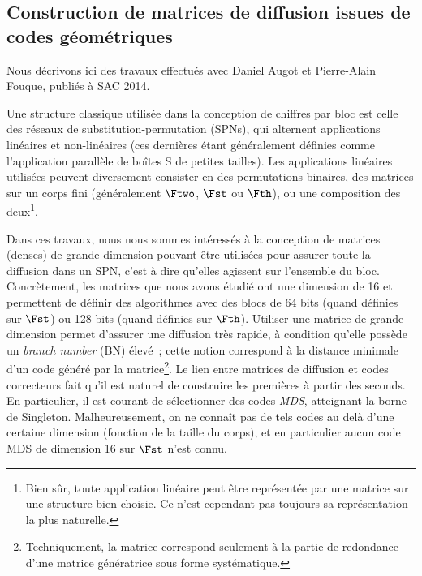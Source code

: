 \subsection[{Construction de matrices de diffusion issues de codes géométriques \cite{DBLP:conf/sacrypt/AugotFK14}}]{Construction de matrices de diffusion issues de codes géométriques~\cite{DBLP:conf/sacrypt/AugotFK14}}

Nous décrivons ici des travaux effectués avec Daniel Augot et Pierre-Alain Fouque, publiés à SAC 2014.

\medskip

Une structure classique utilisée dans la conception de chiffres par bloc est celle des réseaux de substitution-permutation (SPNs), qui alternent applications linéaires et non-linéaires (ces dernières étant
généralement définies comme l'application parallèle de boîtes S de petites tailles). Les applications linéaires utilisées peuvent diversement consister en des permutations binaires, des matrices sur
un corps fini (généralement $\Ftwo$, $\Fst$ ou $\Fth$), ou une composition des deux\footnote{Bien sûr, toute application linéaire peut être représentée par une matrice sur une structure bien choisie. Ce n'est
cependant pas toujours sa représentation la plus naturelle.}.

Dans ces travaux, nous nous sommes intéressés à la conception de matrices (denses)
de grande dimension pouvant être utilisées pour assurer toute la diffusion dans un SPN, c'est à dire qu'elles agissent sur l'ensemble du bloc. Concrètement, les matrices que nous
avons étudié ont une dimension de 16
et permettent de définir des algorithmes avec des blocs de 64 bits (quand définies sur $\Fst$) ou 128 bits (quand définies sur $\Fth$).
Utiliser une matrice de grande dimension permet d'assurer une diffusion très rapide, à condition qu'elle possède un \emph{branch number} (BN) élevé~; cette notion correspond à la
distance minimale d'un code généré par la matrice\footnote{Techniquement, la matrice correspond seulement à la partie de redondance d'une matrice génératrice sous forme systématique.}.
Le lien entre matrices de diffusion et codes correcteurs fait qu'il est naturel de construire les premières à partir des seconds. En particulier, il est courant de sélectionner
des codes \emph{MDS}, atteignant la borne de Singleton. Malheureusement, on ne connaît pas de tels codes au delà d'une certaine dimension (fonction de la taille du corps), et en particulier
aucun code MDS de dimension 16 sur $\Fst$ n'est connu.

